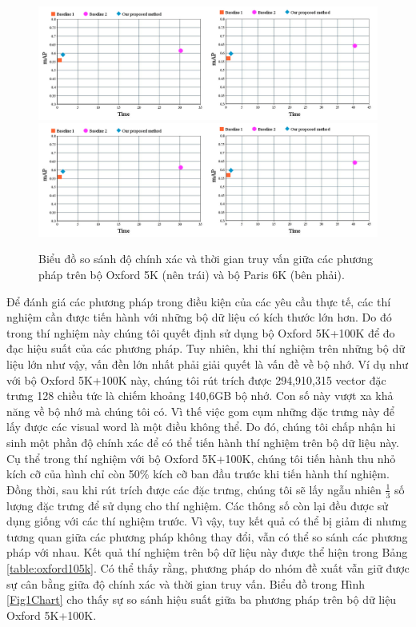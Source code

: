 \begin{figure}[!htbp]
  \begin{center}
    \leavevmode
    \ifpdf
      \includegraphics[scale=0.23]{2_charts}
    \else
      \includegraphics[scale=0.23]{2_charts}
    \fi
    \caption[Biểu đồ so sánh độ chính xác và thời gian truy vấn giữa các phương pháp]{Biểu đồ so sánh độ chính xác và thời gian truy vấn giữa các phương pháp trên bộ Oxford 5K (nên trái) và bộ Paris 6K (bên phải).}
    \label{Fig2Charts}
  \end{center}
\end{figure}

Để đánh giá các phương pháp trong điều kiện của các yêu cầu thực tế, các thí nghiệm cần được tiến hành với những bộ dữ liệu có kích thước lớn hơn. Do đó trong thí nghiệm này chúng tôi quyết định sử dụng bộ Oxford 5K+100K để đo đạc hiệu suất của các phương pháp. Tuy nhiên, khi thí nghiệm trên những bộ dữ liệu lớn như vậy, vấn đền lớn nhất phải giải quyết là vấn đề về bộ nhớ. Ví dụ như với bộ Oxford 5K+100K này, chúng tôi rút trích được 294,910,315 vector đặc trưng 128 chiều tức là chiếm khoảng 140,6GB bộ nhớ. Con số này vượt xa khả năng về bộ nhớ mà chúng tôi có. Vì thế việc gom cụm những đặc trưng này để lấy được các visual word là một điều không thể. Do đó, chúng tôi chấp nhận hi sinh một phần độ chính xác để có thể tiến hành thí nghiệm trên bộ dữ liệu này. Cụ thể trong thí nghiệm với bộ Oxford 5K+100K, chúng tôi tiến hành thu nhỏ kích cỡ của hình chỉ còn 50\% kích cỡ ban đầu trước khi tiến hành thí nghiệm. Đồng thời, sau khi rút trích được các đặc trưng, chúng tôi sẽ lấy ngẫu nhiên $\frac{1}{3}$ số lượng đặc trưng để sử dụng cho thí nghiệm. Các thông số còn lại đều được sử dụng giống với các thí nghiệm trước. Vì vậy, tuy kết quả có thể bị giảm đi nhưng tương quan giữa các phương pháp không thay đổi, vẫn có thể so sánh các phương pháp với nhau. Kết quả thí nghiệm trên bộ dữ liệu này được thể hiện trong Bảng \ref{table:oxford105k}. Có thể thấy rằng, phương pháp do nhóm đề xuất vẫn giữ được sự cân bằng giữa độ chính xác và thời gian truy vấn. Biểu đồ trong Hình \ref{Fig1Chart} cho thấy sự so sánh hiệu suất giữa ba phương pháp trên bộ dữ liệu Oxford 5K+100K.

